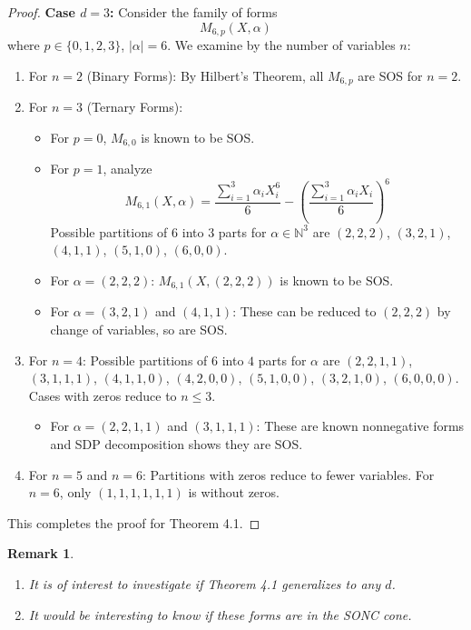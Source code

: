 \documentclass{article}
\newtheorem{remark}{Remark}
\begin{document}
\begin{proof}
	\textbf{Case $d=3$:}
Consider the family of forms
\[
   M_{6,p}(X, \alpha)
\]
where $p \in \{0,1,2,3\}$, $|\alpha|=6$. We examine by the number of variables $n$:
\begin{enumerate}
   \item For $n=2$ (Binary Forms): By Hilbert's Theorem, all $M_{6,p}$ are SOS for $n=2$.
   \item For $n=3$ (Ternary Forms):
      \begin{itemize}
         \item For $p=0$, $M_{6,0}$ is known to be SOS.
         \item For $p=1$, analyze
         \[
            M_{6,1}(X, \alpha) = \frac{\sum_{i=1}^3 \alpha_i X_i^6}{6} - \left( \frac{\sum_{i=1}^3 \alpha_i X_i}{6} \right)^6
         \]
         Possible partitions of $6$ into $3$ parts for $\alpha \in \mathbb{N}^3$ are $(2,2,2)$, $(3,2,1)$, $(4,1,1)$, $(5,1,0)$, 
         $(6,0,0)$.
         \item For $\alpha=(2,2,2)$: $M_{6,1}(X,(2,2,2))$ is known to be SOS.
         \item For $\alpha=(3,2,1)$ and $(4,1,1)$: These can be reduced to $(2,2,2)$ by change of variables, so are SOS.
      \end{itemize}
   \item For $n=4$: Possible partitions of $6$ into $4$ parts for $\alpha$ are $(2,2,1,1)$, $(3,1,1,1)$, $(4,1,1,0)$, $(4,2,0,0)$, $(5,1,0,0)$, $(3,2,1,0)$, $(6,0,0,0)$. Cases with zeros reduce to $n \leq 3$.
      \begin{itemize}
         \item For $\alpha=(2,2,1,1)$ and $(3,1,1,1)$: These are known nonnegative forms and SDP decomposition shows 
         they are SOS.
      \end{itemize}
   \item For $n=5$ and $n=6$: Partitions with zeros reduce to fewer variables. For $n=6$, only $(1,1,1,1,1,1)$ is without zeros.
\end{enumerate}
This completes the proof for Theorem 4.1.
\end{proof}

\begin{remark}
\begin{enumerate}
   \item It is of interest to investigate if Theorem 4.1 generalizes to any $d$.
   \item It would be interesting to know if these forms are in the SONC cone.
\end{enumerate}
\end{remark}
\end{document}
